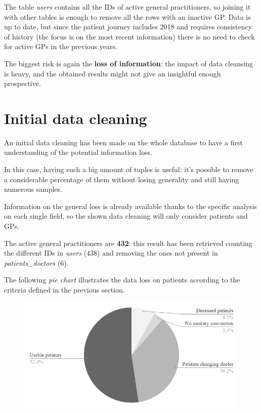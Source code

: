 The table \textit{users} contains all the IDs of active general practitioners, so joining it with other tables is enough to remove all the rows with an inactive GP. Data is up to date, but since the patient journey includes 2018 and requires consistency of history (the focus is on the most recent information) there is no need to check for active GPs in the previous years.

The biggest risk is again the \textbf{loss of information}: the impact of data cleansing is heavy, and the obtained results might not give an insightful enough prospective.

\section{Initial data cleaning}
An initial data cleaning has been made on the whole database to have a first understanding of the potential information loss.

In this case, having such a big amount of tuples is useful: it's possible to remove a considerable percentage of them without losing generality and still having numerous samples.

Information on the general loss is already available thanks to the specific analysis on each single field, so the shown data cleaning will only consider patients and GPs.

The active general practitioners are \textbf{432}: this result has been retrieved counting the different IDs in \textit{users} (438) and removing the ones not present in \textit{patients\_doctors} (6).

The following \textit{pie chart} illustrates the data loss on patients according to the criteria defined in the previous section.
\begin{figure}[h]
	\centering
	\includegraphics[scale=0.6]{images/pie0018.png}
\end{figure}

